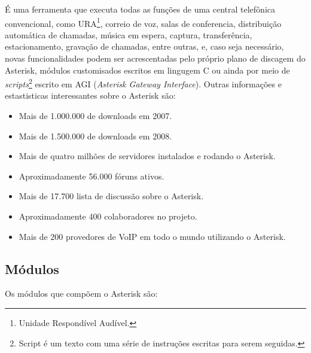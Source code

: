 É uma ferramenta que executa todas as funções de uma central telefônica convencional, como URA\footnote{Unidade Respondível Audível.}, correio de voz, salas de conferencia, distribuição automática de chamadas, música em espera, captura, transferência, estacionamento, gravação de chamadas, entre outras, e, caso seja necessário, novas funcionalidades podem ser acrescentadas pelo próprio plano de discagem do Asterisk, módulos customisados escritos em lingugem C ou ainda por meio de \textit{scripts}\footnote{Script é um texto com uma série de instruções escritas para serem seguidas.} escrito em AGI (\textit{Asterisk Gateway Interface}). Outras informações e estastisticas interessantes sobre o Asterisk são: \cite{alexandrekeller2014}

\begin{itemize}
  \item Mais de 1.000.000 de downloads em 2007.
  \item Mais de 1.500.000 de downloads em 2008.
  \item Mais de quatro milhões de servidores instalados e rodando o Asterisk.
  \item Aproximadamente 56.000 fóruns ativos.
  \item Mais de 17.700 lista de discussão sobre o Asterisk.
  \item Aproximadamente 400 colaboradores no projeto.
  \item Mais de 200 provedores de VoIP em todo o mundo utilizando o Asterisk.
\end{itemize}

\subsection{Módulos}
Os módulos que compõem o Asterisk são: \cite{books/daglib/0018909}

